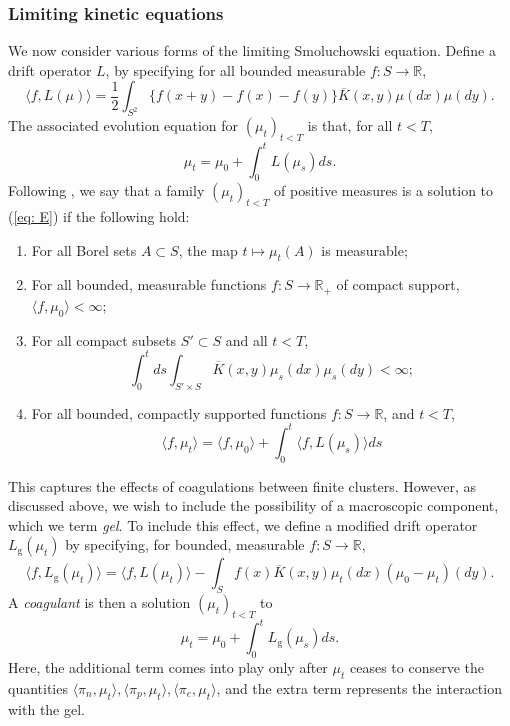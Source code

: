 \documentclass[11pt, notitlepage]{article}
\begin{document}
\subsubsection{\textbf{Limiting kinetic equations}}
We now consider various forms of the limiting Smoluchowski equation.  Define a drift operator $L$, by specifying for all bounded measurable $f\colon S \rightarrow \mathbb{R}$, 
 \begin{equation} \label{eq: drift wo gel}
    \langle f,L(\mu)\rangle=\frac{1}{2}\int_{S^2}\{f(x+y)-f(x)-f(y)\}\overline{K}(x,y)\mu(dx)\mu(dy).
\end{equation}
The associated evolution equation for $(\mu_t)_{t<T}$ is that, for all $t<T$,
\begin{equation}
    \tag{E-G}\label{eq: E} \mu_t =  \mu_0 +\int_0^t L(\mu_s) ds.
\end{equation} Following \cite{N00}, we say that a family $(\mu_t)_{t<T}$ of positive measures is a solution to (\ref{eq: E}) if the following hold: \begin{enumerate}[label=\roman{*}).] \item For all Borel sets $A\subset S$, the map $t\mapsto \mu_t(A)$ is measurable; \item For all bounded, measurable functions $f:S\rightarrow \mathbb{R}_+$ of compact support, $\langle f, \mu_0\rangle<\infty$; \item For all compact subsets $S'\subset S$ and all $t<T$, \begin{equation} \int_0^t ds \int_{S'\times S}\overline{K}(x,y)\mu_s(dx)\mu_s(dy)<\infty; \end{equation}  \item For all bounded, compactly supported functions $f:S\rightarrow \mathbb{R}$, and $t<T$, \begin{equation}
    \langle f, \mu_t \rangle =  \langle f,\mu_0\rangle +\int_0^t \langle f, L(\mu_s)\rangle ds
\end{equation} \end{enumerate} 
 This captures the effects of coagulations between finite clusters. However, as discussed above, we wish to include the possibility of a macroscopic component, which we term \emph{gel}. To include this effect, we define a modified drift operator $L_\mathrm{g}(\mu_t)$ by specifying, for bounded, measurable $f:S\rightarrow \mathbb{R}$, \begin{equation} \langle f,L_\mathrm{g}(\mu_t)\rangle =\langle f, L(\mu_t)\rangle -\int_{S}f(x)\overline{K}(x,y)\mu_t(dx)(\mu_0-\mu_t)(dy). \end{equation} A \emph{coagulant} is then a solution $(\mu_t)_{t<T}$ to \begin{equation} \tag{E+G} \label{eq: E+G}
    \mu_t= \mu_0 + \int_0^t L_\mathrm{g}(\mu_s)ds.
\end{equation} Here, the additional term comes into play only after $\mu_t$ ceases to conserve the quantities $\langle \pi_n, \mu_t\rangle, \langle \pi_p, \mu_t\rangle ,\langle \pi_e, \mu_t\rangle$, and the extra term represents the interaction with the gel.
\end{document}
